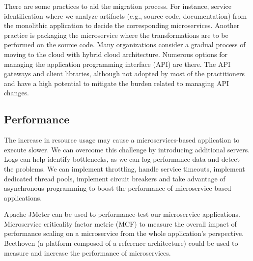 There are some practices to aid the migration process.
For instance, service identification where we analyze artifacts (e.g., source code, documentation) from the monolithic application to decide the corresponding microservices.
%
Another practice is packaging the microservice where the transformations are to be performed on the source code.\cite{selmadji2020}
%
Many organizations consider a gradual process of moving to the cloud with hybrid cloud architecture.\cite{Mikail2020}
Numerous options for managing the application programming interface (API) are there. The API gateways and client libraries, although not adopted by most of the practitioners and have a high potential to mitigate the burden related to managing API changes.\cite{wang2020}


\subsection{Performance}%
The increase in resource usage may cause a microservices-based application to execute slower. We can overcome this challenge by introducing additional servers. Logs can help identify bottlenecks, as we can log performance data and detect the problems. %
We can implement throttling, handle service timeouts, implement dedicated thread pools, implement circuit breakers and take advantage of asynchronous programming to boost the performance of microservice-based applications.\cite{Ghebremicael2017, Johansson2019, Zhihui2020}

Apache JMeter can be used to performance-test our microservice applications. Microservice criticality factor metric (MCF) to measure the overall impact of performance scaling on a microservice from the whole application's perspective.\cite{Hou2019} Beethoven (a platform composed of a reference architecture) could be used to measure and increase the performance of microservices.\cite{Monteiro2020}


